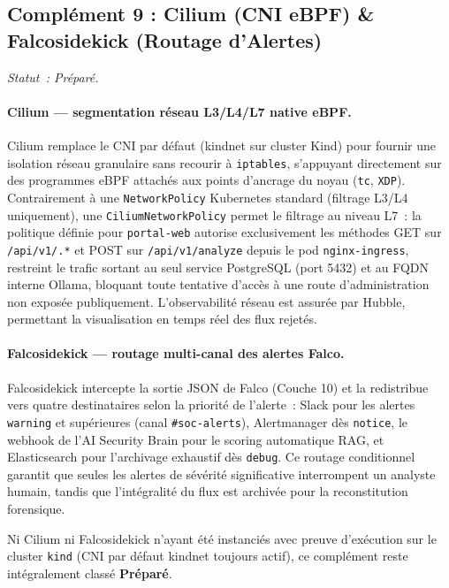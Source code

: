 \subsection{Complément 9 : Cilium (CNI eBPF) \& Falcosidekick (Routage d'Alertes)}
\label{subsec:comp_cilium_falcosidekick}
\textit{Statut~: Préparé.}

\paragraph{Cilium — segmentation réseau L3/L4/L7 native eBPF.}
Cilium remplace le CNI par défaut (kindnet sur cluster Kind) pour fournir une isolation réseau granulaire sans recourir à \texttt{iptables}, s'appuyant directement sur des programmes eBPF attachés aux points d'ancrage du noyau (\texttt{tc}, \texttt{XDP}). Contrairement à une \texttt{NetworkPolicy} Kubernetes standard (filtrage L3/L4 uniquement), une \texttt{CiliumNetworkPolicy} permet le filtrage au niveau L7~: la politique définie pour \texttt{portal-web} autorise exclusivement les méthodes GET sur \texttt{/api/v1/.*} et POST sur \texttt{/api/v1/analyze} depuis le pod \texttt{nginx-ingress}, restreint le trafic sortant au seul service PostgreSQL (port 5432) et au FQDN interne Ollama, bloquant toute tentative d'accès à une route d'administration non exposée publiquement. L'observabilité réseau est assurée par Hubble, permettant la visualisation en temps réel des flux rejetés.

\paragraph{Falcosidekick — routage multi-canal des alertes Falco.}
Falcosidekick intercepte la sortie JSON de Falco (Couche 10) et la redistribue vers quatre destinataires selon la priorité de l'alerte~: Slack pour les alertes \texttt{warning} et supérieures (canal \texttt{\#soc-alerts}), Alertmanager dès \texttt{notice}, le webhook de l'AI Security Brain pour le scoring automatique RAG, et Elasticsearch pour l'archivage exhaustif dès \texttt{debug}. Ce routage conditionnel garantit que seules les alertes de sévérité significative interrompent un analyste humain, tandis que l'intégralité du flux est archivée pour la reconstitution forensique.

Ni Cilium ni Falcosidekick n'ayant été instanciés avec preuve d'exécution sur le cluster \texttt{kind} (CNI par défaut kindnet toujours actif), ce complément reste intégralement classé \textbf{Préparé}.


